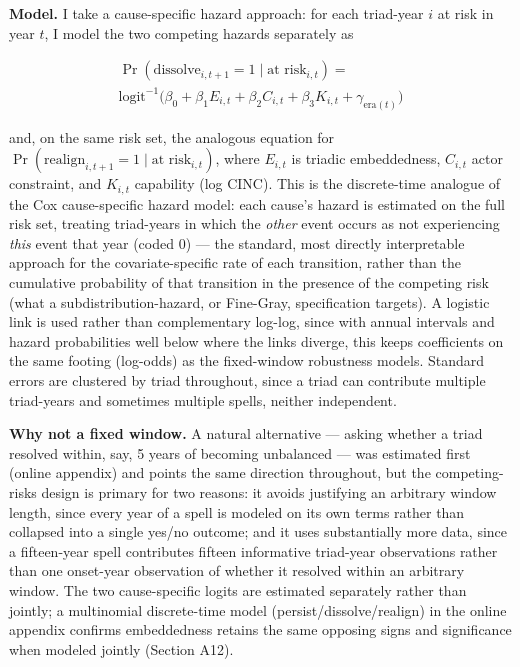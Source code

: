 \documentclass[Afour,sageh,times,doublespace]{sagej}
\begin{document}
\textbf{Model.} I take a cause-specific hazard approach: for each triad-year $i$ at risk in year $t$, I model the two competing hazards separately as

\begin{multline*}
\Pr(\text{dissolve}_{i,t+1} = 1 \mid \text{at risk}_{i,t}) = \\
\text{logit}^{-1}\big(\beta_0 + \beta_1 E_{i,t} + \beta_2 C_{i,t} + \beta_3 K_{i,t} + \gamma_{\text{era}(t)}\big)
\end{multline*}

and, on the same risk set, the analogous equation for $\Pr(\text{realign}_{i,t+1}=1 \mid \text{at risk}_{i,t})$, where $E_{i,t}$ is triadic embeddedness, $C_{i,t}$ actor constraint, and $K_{i,t}$ capability (log CINC). This is the discrete-time analogue of the Cox cause-specific hazard model: each cause's hazard is estimated on the full risk set, treating triad-years in which the \emph{other} event occurs as not experiencing \emph{this} event that year (coded 0) --- the standard, most directly interpretable approach for the covariate-specific rate of each transition, rather than the cumulative probability of that transition in the presence of the competing risk (what a subdistribution-hazard, or Fine-Gray, specification targets). A logistic link is used rather than complementary log-log, since with annual intervals and hazard probabilities well below where the links diverge, this keeps coefficients on the same footing (log-odds) as the fixed-window robustness models. Standard errors are clustered by triad throughout, since a triad can contribute multiple triad-years and sometimes multiple spells, neither independent.

\textbf{Why not a fixed window.} A natural alternative --- asking whether a triad resolved within, say, 5 years of becoming unbalanced --- was estimated first (online appendix) and points the same direction throughout, but the competing-risks design is primary for two reasons: it avoids justifying an arbitrary window length, since every year of a spell is modeled on its own terms rather than collapsed into a single yes/no outcome; and it uses substantially more data, since a fifteen-year spell contributes fifteen informative triad-year observations rather than one onset-year observation of whether it resolved within an arbitrary window. The two cause-specific logits are estimated separately rather than jointly; a multinomial discrete-time model (persist/dissolve/realign) in the online appendix confirms embeddedness retains the same opposing signs and significance when modeled jointly (Section A12).
\end{document}
